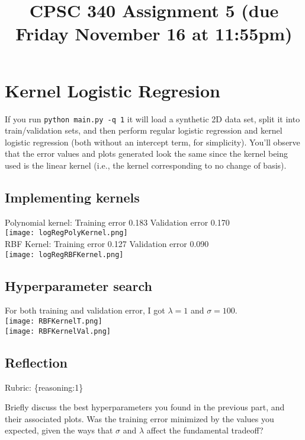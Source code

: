 \documentclass{article}
\def\rubric#1{\gre{Rubric: \{#1\}}}{}
\def\gre#1{{\color{gre}#1}}
\begin{document}
\title{CPSC 340 Assignment 5 (due Friday November 16 at 11:55pm)}
\date{}
\maketitle

\vspace{-7em}

\section{Kernel Logistic Regresion}

If you run \verb|python main.py -q 1| it will load a synthetic 2D data set, split it into train/validation sets, and then perform regular logistic regression and kernel logistic regression (both without an intercept term, for simplicity). You'll observe that the error values and plots generated look the same since the kernel being used is the linear kernel (i.e., the kernel corresponding to no change of basis).

\subsection{Implementing kernels}
Polynomial kernel:
Training error 0.183
Validation error 0.170\\
\texttt{[image: logRegPolyKernel.png]}\\

RBF Kernel: 
Training error 0.127
Validation error 0.090\\
\texttt{[image: logRegRBFKernel.png]}\\

\subsection{Hyperparameter search}
For both training and validation error, I got $\lambda = 1$ and $\sigma = 100$.\\
\texttt{[image: RBFKernelT.png]}\\
\texttt{[image: RBFKernelVal.png]}\\
\subsection{Reflection}
\rubric{reasoning:1}

Briefly discuss the best hyperparameters you found in the previous part, and their associated plots. Was the training error minimized by the values you expected, given the ways that $\sigma$ and $\lambda$ affect the fundamental tradeoff?
\end{document}

